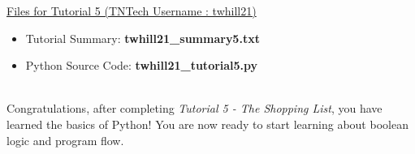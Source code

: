 \documentclass[12pt]{article}
\begin{document}
\begin{description}[labelindent=1cm]
\underline{Files for Tutorial 5 (TNTech Username : twhill21)}

\begin{itemize}

\item Tutorial Summary: \textbf{ twhill21\_summary5.txt}

\item Python Source Code: \textbf{ twhill21\_tutorial5.py}

\end{itemize}


\item[\textbf{\underline{Tutorial Complete:}}] \hfill \vspace{3mm}\\ 
	Congratulations, after completing {\it Tutorial 5 - The Shopping List}, you have learned the basics of Python! You are now ready to start learning about boolean logic and program flow. \\

\end{description}
\end{document}
